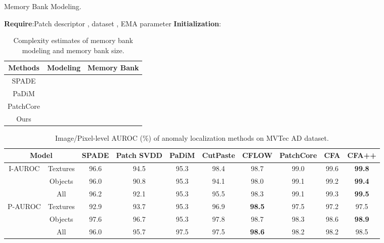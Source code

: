 \documentclass[10pt,twocolumn,letterpaper]{article}
\begin{document}
\begin{algorithm}[t]
\caption{Memory Bank Modeling.}
    \begin{algorithmic}\small
        \STATE \textbf{Require\textbf{}}:Patch descriptor , dataset , EMA parameter 
        \STATE \textbf{Initialization}: 
        \FOR{  }
            \STATE 
            \FOR{  }
                \STATE 
                \STATE 
            \ENDFOR
            \STATE 
        \ENDFOR
        \STATE 
        \RETURN 
    \end{algorithmic}
\label{algorithm:modeling}
\end{algorithm}         \begin{table}[t!] 
\caption{Complexity estimates of memory bank modeling and memory bank size.}
\begin{center}\small
\begin{tabular}{c | c | c}
    \toprule
    \textbf{Methods} & Modeling & Memory Bank \\
    \midrule
    SPADE      &  & \\
    \midrule
    PaDiM      &  & \\  
    \midrule
    PatchCore  &  & \\  
    \midrule
    Ours       &  & \\
    \bottomrule
\end{tabular}
\end{center}
\label{table:complexity}\vspace{-0.15cm}
\end{table}         \begin{table*}[t!]
\caption{Image/Pixel-level AUROC (\%) of anomaly localization methods on MVTec AD dataset.}
\begin{center}
\begin{tabular}{c | c | c c c c c c | c c}
\toprule
\multicolumn{2}{c|}{Model}           & SPADE & Patch SVDD & PaDiM & CutPaste & CFLOW & PatchCore & CFA & CFA++ \\
\midrule
\multirow{3}{*}{I-AUROC}  & Textures &  96.6 &    94.5    &  95.3 &   98.4   &  98.7 &    99.0   & 99.6 & \textbf{99.8}  \\
                          & Objects  &  96.0 &    90.8    &  95.3 &   94.1   &  98.0 &    99.1   & 99.2 &  \textbf{99.4}  \\
                          &   All    &  96.2 &    92.1    &  95.3 &   95.5   &  98.3 &    99.1   & 99.3 &  \textbf{99.5}  \\
\midrule
\multirow{3}{*}{P-AUROC}  & Textures &  92.9 &    93.7    &  95.3 &   96.9   &  \textbf{98.5} &    97.5   & 97.2 &  97.5  \\
                          & Objects  &  97.6 &    96.7    &  95.3 &   97.8   &  98.7 &    98.3   & 98.6 &  \textbf{98.9}  \\
                          &   All    &  96.0 &    95.7    &  97.5 &   97.5   &  \textbf{98.6} &    98.2   & 98.2 &  98.5  \\
\bottomrule
\end{tabular}
\end{center}
\label{table:mvtec-ad}\vspace{-0.15cm}
\end{table*}
         
\end{document}
